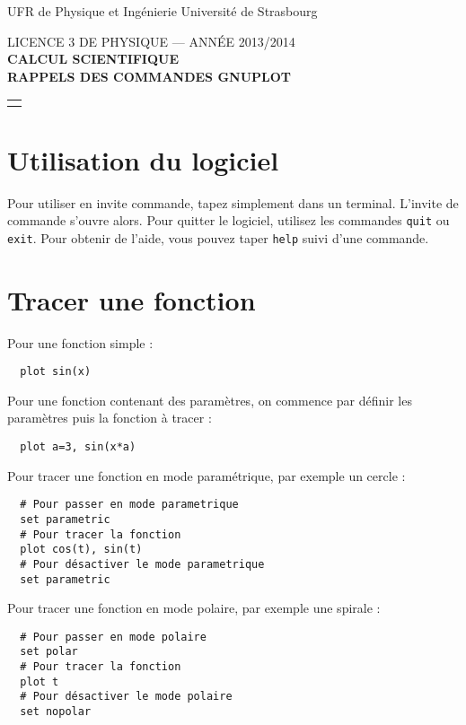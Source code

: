 \documentclass [a4paper]{article}
\newcommand{\bc}{\begin{center}}
\newcommand{\ec}{\end{center}}
\begin{document}
\noindent UFR de Physique et Ing\'enierie \hfill Universit\'e de Strasbourg

\bc
 LICENCE 3 DE PHYSIQUE --- ANN\'EE 2013/2014 \\
 
 \textbf{CALCUL SCIENTIFIQUE}\\
 
 \textbf{RAPPELS DES COMMANDES GNUPLOT} \\
\ec
 
 
\noindent\begin{tabular}{p{17.2cm}}
 \hline
 \\
\end{tabular}


\section{Utilisation du logiciel}

Pour utiliser  en invite commande, tapez simplement \verb?? dans un terminal. L'invite de commande  s'ouvre alors. Pour quitter le logiciel, utilisez les commandes \verb?quit? ou \verb?exit?. Pour obtenir de l'aide, vous pouvez taper \verb?help? suivi d'une commande.

\section{Tracer une fonction}

\noindent
Pour une fonction simple :
\begin{verbatim}
  plot sin(x)
\end{verbatim}

\noindent
Pour une fonction contenant des paramètres, on commence par définir les paramètres puis la fonction à tracer :
\begin{verbatim}
  plot a=3, sin(x*a)
\end{verbatim}

\noindent
Pour tracer une fonction en mode paramétrique, par exemple un cercle :
\begin{verbatim}
  # Pour passer en mode parametrique
  set parametric
  # Pour tracer la fonction
  plot cos(t), sin(t)
  # Pour désactiver le mode parametrique
  set parametric
\end{verbatim}

\noindent
Pour tracer une fonction en mode polaire, par exemple une spirale :
\begin{verbatim}
  # Pour passer en mode polaire
  set polar
  # Pour tracer la fonction
  plot t
  # Pour désactiver le mode polaire
  set nopolar
\end{verbatim}
\end{document}
